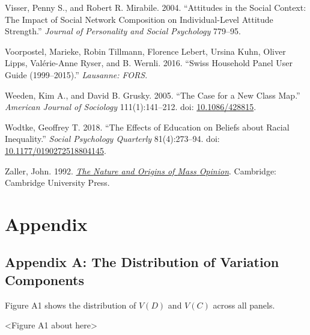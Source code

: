 \documentclass[
  12pt,
]{article}
\newlength{\cslhangindent}
\newlength{\cslentryspacingunit} %
\newenvironment{CSLReferences}[2] %
 {%
  \setlength{\parindent}{0pt}
  \ifodd #1
  \let\oldpar\par
  \def\par{\hangindent=\cslhangindent\oldpar}
  \fi
  \setlength{\parskip}{#2\cslentryspacingunit}
 }%
 {}
\begin{document}
\begin{CSLReferences}{1}{0}
\leavevmode{}%
Visser, Penny S., and Robert R. Mirabile. 2004. {``Attitudes in the
Social Context: {The} Impact of Social Network Composition on
Individual-Level Attitude Strength.''} \emph{Journal of Personality and
Social Psychology} 779--95.

\leavevmode{}%
Voorpostel, Marieke, Robin Tillmann, Florence Lebert, Ursina Kuhn,
Oliver Lipps, Valérie-Anne Ryser, and B. Wernli. 2016. {``Swiss
Household Panel User Guide (1999--2015).''} \emph{Lausanne: FORS}.

\leavevmode{}%
Weeden, Kim A., and David B. Grusky. 2005. {``The {Case} for a {New}
{Class} {Map}.''} \emph{American Journal of Sociology} 111(1):141--212.
doi: \href{https://doi.org/10.1086/428815}{10.1086/428815}.

\leavevmode{}%
Wodtke, Geoffrey T. 2018. {``The {Effects} of {Education} on {Beliefs}
about {Racial} {Inequality}.''} \emph{Social Psychology Quarterly}
81(4):273--94. doi:
\href{https://doi.org/10.1177/0190272518804145}{10.1177/0190272518804145}.

\leavevmode{}%
Zaller, John. 1992.
\emph{\href{https://doi.org/10.1017/CBO9780511818691}{The {Nature} and
{Origins} of {Mass} {Opinion}}}. Cambridge: Cambridge University Press.

\end{CSLReferences}

\newpage

\hypertarget{appendix}{%
\section{Appendix}\label{appendix}}

\hypertarget{appendix-a-the-distribution-of-variation-components}{%
\subsection{Appendix A: The Distribution of Variation
Components}\label{appendix-a-the-distribution-of-variation-components}}

Figure A1 shows the distribution of \(V(D)\) and \(V(C)\) across all
panels.

\begin{center}
<Figure A1 about here>
\end{center}
\end{document}
